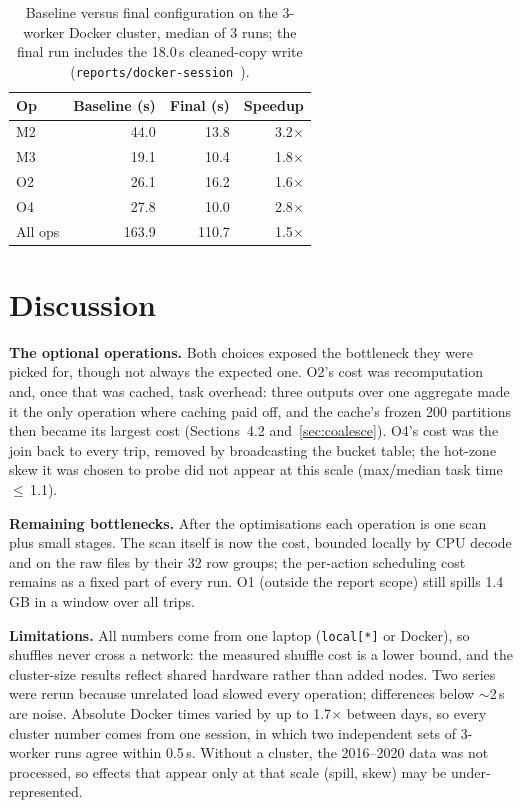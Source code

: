 \documentclass[sigconf]{acmart}
\newcommand{\srcpath}[1]{\texttt{reports/#1}~\cite{repo}}
\begin{document}
\begin{table}[!t]
      \centering
      \footnotesize
      \begin{tabular}{lrrr}
            \toprule
            Op      & Baseline (s) & Final (s) & Speedup     \\
            \midrule
            M2      & 44.0         & 13.8      & 3.2$\times$ \\
            M3      & 19.1         & 10.4      & 1.8$\times$ \\
            O2      & 26.1         & 16.2      & 1.6$\times$ \\
            O4      & 27.8         & 10.0      & 2.8$\times$ \\
            All ops & 163.9        & 110.7     & 1.5$\times$ \\
            \bottomrule
      \end{tabular}
      \caption{Baseline versus final configuration on the 3-worker Docker
            cluster, median of 3 runs; the final run includes the 18.0\,s
            cleaned-copy write (\srcpath{docker-session}).}
      \label{tab:dockerbase}
\end{table}

\section{Discussion}

\textbf{The optional operations.} Both choices exposed the bottleneck they were
picked for, though not always the expected one. O2's cost was recomputation and,
once that was cached, task overhead: three outputs over one aggregate made it
the only operation where caching paid off, and the cache's frozen 200
partitions then became its largest cost (Sections~4.2 and~\ref{sec:coalesce}).
O4's cost was the join back to every trip, removed by broadcasting the bucket
table; the hot-zone skew it was chosen to probe did not appear at this scale
(max/median task time $\le$\,1.1).

\textbf{Remaining bottlenecks.} After the optimisations each operation is one scan
plus small stages. The scan itself is now the cost, bounded locally by CPU decode
and on the raw files by their 32 row groups; the per-action scheduling cost
remains as a fixed part of every run.  O1 (outside the report scope) still spills
1.4\,GB in a window over all trips.

\textbf{Limitations.} All numbers come from one laptop (\texttt{local[*]} or
Docker), so shuffles never cross a network: the measured shuffle cost is a lower
bound, and the cluster-size results reflect shared hardware rather than added
nodes. Two series were rerun because unrelated load slowed every operation;
differences below $\sim$2\,s are noise. Absolute Docker times varied by up to
1.7$\times$ between days, so every cluster number comes from one session, in
which two independent sets of 3-worker runs agree within 0.5\,s. Without a cluster, the 2016--2020 data
was not processed, so effects that appear only at that scale (spill, skew) may
be under-represented.
\end{document}
